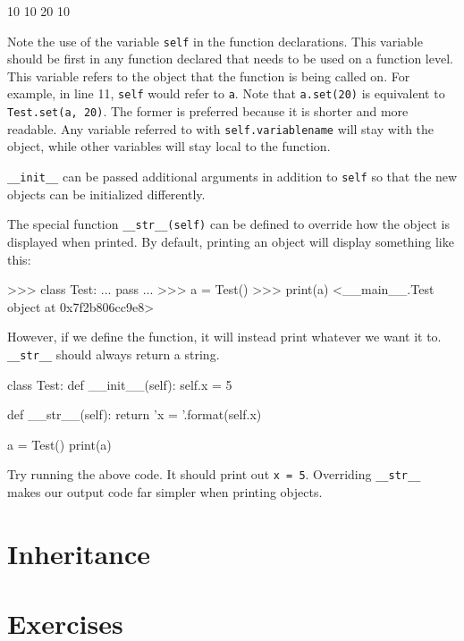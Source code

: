 \documentclass[11pt]{cselabheader}
\begin{document}
\begin{pyconcode}
10 10
20 10
\end{pyconcode}

Note the use of the variable \lstinline{self} in the function declarations.
This variable should be first in any function declared that needs to be used on
a function level. This variable refers to the object that the function is
being called on. For example, in line 11, \lstinline{self} would refer to
\lstinline{a}. Note that \lstinline{a.set(20)} is equivalent to
\lstinline{Test.set(a, 20)}. The former is preferred because it is shorter and
more readable. Any variable referred to with \lstinline{self.variablename} will
stay with the object, while other variables will stay local to the function.

\lstinline{__init__} can be passed additional arguments in addition to
\lstinline{self} so that the new objects can be initialized differently.

The special function \lstinline{__str__(self)} can be defined to override
how the object is displayed when printed. By default, printing an object will
display something like this:

\begin{pyconcode}
>>> class Test:
...     pass
... 
>>> a = Test()
>>> print(a)
<__main__.Test object at 0x7f2b806cc9e8>
\end{pyconcode}

However, if we define the function, it will instead print whatever we want it
to. \lstinline{__str__} should always return a string.

\begin{python3code}
class Test:
    def __init__(self):
        self.x = 5

    def __str__(self):
        return 'x = {}'.format(self.x)

a = Test()
print(a)
\end{python3code}

Try running the above code. It should print out \lstinline{x = 5}. Overriding
\lstinline{__str__} makes our output code far simpler when printing objects.

\section{Inheritance}
\label{sec:inheritance}


\clearpage
\section{Exercises}
\label{sec:ex}
\end{document}
